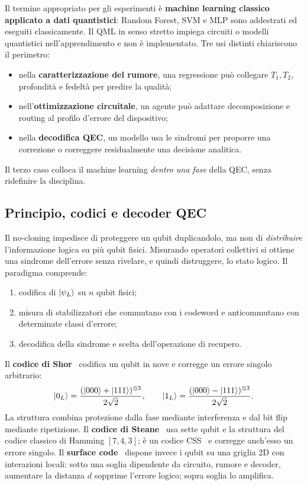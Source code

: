 Il termine appropriato per gli esperimenti è \textbf{machine learning classico
applicato a dati quantistici}: Random Forest, \ac{SVM} e \ac{MLP} sono
addestrati ed eseguiti classicamente. Il \ac{QML} in senso stretto impiega
circuiti o modelli quantistici nell'apprendimento e non è implementato. Tre usi
distinti chiariscono il perimetro:
\begin{itemize}
    \item nella \textbf{caratterizzazione del rumore}, una regressione può
    collegare $T_1,T_2$, profondità e fedeltà per predire la qualità;
    \item nell'\textbf{ottimizzazione circuitale}, un agente può adattare
    decomposizione e routing al profilo d'errore del dispositivo;
    \item nella \textbf{decodifica QEC}, un modello usa le sindromi per
    proporre una correzione o correggere residualmente una decisione analitica.
\end{itemize}
Il terzo caso colloca il machine learning \emph{dentro una fase} della QEC,
senza ridefinire la disciplina.

\subsection{Principio, codici e decoder QEC}
\label{app:qec_richiami_teoria}

Il no-cloning impedisce di proteggere un qubit duplicandolo, ma non di
\emph{distribuire} l'informazione logica su più qubit fisici. Misurando
operatori collettivi si ottiene una sindrome dell'errore senza rivelare, e
quindi distruggere, lo stato logico. Il paradigma comprende:
\begin{enumerate}
    \item codifica di $\ket{\psi_L}$ su $n$ qubit fisici;
    \item misura di stabilizzatori che commutano con i codeword e
    anticommutano con determinate classi d'errore;
    \item decodifica della sindrome e scelta dell'operazione di recupero.
\end{enumerate}

Il \textbf{codice di Shor}~\cite{shorcorrection1995} codifica un qubit in nove
e corregge un errore singolo arbitrario:
\begin{equation}
 \ket{0_L}=\frac{(\ket{000}+\ket{111})^{\otimes3}}{2\sqrt2},\qquad
 \ket{1_L}=\frac{(\ket{000}-\ket{111})^{\otimes3}}{2\sqrt2}.
\end{equation}
La struttura combina protezione dalla fase mediante interferenza e dal bit flip
mediante ripetizione. Il \textbf{codice di Steane}~\cite{steane1996} usa sette
qubit e la struttura del codice classico di Hamming $[7,4,3]$; è un codice
\ac{CSS}~\cite{calderbankShor1996} e corregge anch'esso un errore singolo. Il
\textbf{surface code}~\cite{fowler2012} dispone invece i qubit su una griglia
2D con interazioni locali: sotto una soglia dipendente da circuito, rumore e
decoder, aumentare la distanza $d$ sopprime l'errore logico; sopra soglia lo
amplifica.

